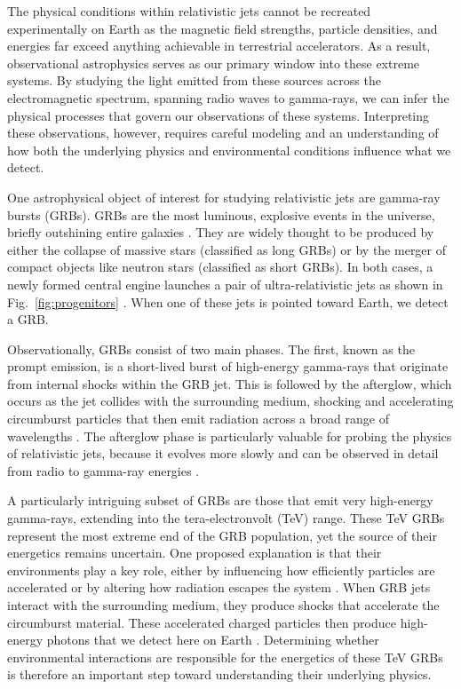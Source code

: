 \documentclass{article}
\begin{document}
The physical conditions within relativistic jets cannot be recreated experimentally on Earth as the magnetic field strengths, particle densities, and energies far exceed anything achievable in terrestrial accelerators. As a result, observational astrophysics serves as our primary window into these extreme systems. By studying the light emitted from these sources across the electromagnetic spectrum, spanning radio waves to gamma-rays, we can infer the physical processes that govern our observations of these systems. Interpreting these observations, however, requires careful modeling and an understanding of how both the underlying physics and environmental conditions influence what we detect. 

One astrophysical object of interest for studying relativistic jets are gamma-ray bursts (GRBs). GRBs are the most luminous, explosive events in the universe, briefly outshining entire galaxies \parencite{GRBs_science}. They are widely thought to be produced by either the collapse of massive stars (classified as long GRBs) or by the merger of compact objects like neutron stars (classified as short GRBs). In both cases, a newly formed central engine launches a pair of ultra-relativistic jets as shown in Fig.~\ref{fig:progenitors} \parencite{kouv_1993, fireball}. When one of these jets is pointed toward Earth, we detect a GRB.

Observationally, GRBs consist of two main phases. The first, known as the prompt emission, is a short-lived burst of high-energy gamma-rays that originate from internal shocks within the GRB jet. This is followed by the afterglow, which occurs as the jet collides with the surrounding medium, shocking and accelerating circumburst particles that then emit radiation across a broad range of wavelengths \parencite{fireball, afterglow, inv_Compton}. The afterglow phase is particularly valuable for probing the physics of relativistic jets, because it evolves more slowly and can be observed in detail from radio to gamma-ray energies \parencite{jets_in_GRBs}. 

A particularly intriguing subset of GRBs are those that emit very high-energy gamma-rays, extending into the tera-electronvolt (TeV) range. These TeV GRBs represent the most extreme end of the GRB population, yet the source of their energetics remains uncertain. One proposed explanation is that their environments play a key role, either by influencing how efficiently particles are accelerated or by altering how radiation escapes the system \parencite{VHEGRBs}. When GRB jets interact with the surrounding medium, they produce shocks that accelerate the circumburst material. These accelerated charged particles then produce high-energy photons that we detect here on Earth \parencite{high-energy}. Determining whether environmental interactions are responsible for the energetics of these TeV GRBs is therefore an important step toward understanding their underlying physics. 
\end{document}

